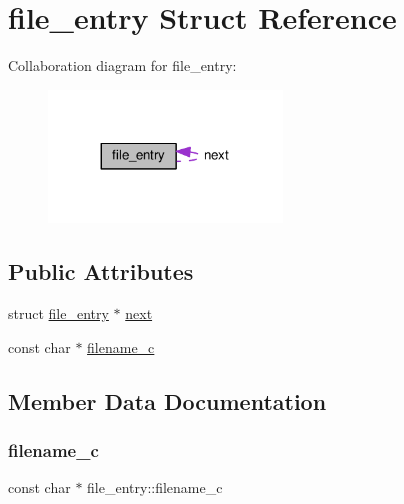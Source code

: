 \hypertarget{structfile__entry}{}\section{file\+\_\+entry Struct Reference}
\label{structfile__entry}


Collaboration diagram for file\+\_\+entry\+:
\nopagebreak
\begin{figure}[H]
\begin{center}
\leavevmode
\includegraphics[width=176pt]{structfile__entry__coll__graph}
\end{center}
\end{figure}
\subsection*{Public Attributes}
\begin{DoxyCompactItemize}
\item 
struct \hyperlink{structfile__entry}{file\+\_\+entry} $\ast$ \hyperlink{structfile__entry_a839b5cddc728fa5bd2f78258186c3527}{next}
\item 
const char $\ast$ \hyperlink{structfile__entry_add08d64d3f65eab11a83a7af31fe3da1}{filename\+\_\+c}
\end{DoxyCompactItemize}


\subsection{Member Data Documentation}
\mbox{\label{structfile__entry_add08d64d3f65eab11a83a7af31fe3da1}} 
\subsubsection{\texorpdfstring{filename\+\_\+c}{filename\_c}}
{\footnotesize\ttfamily const char $\ast$ file\+\_\+entry\+::filename\+\_\+c}

\mbox{\label{structfile__entry_a839b5cddc728fa5bd2f78258186c3527}} 
